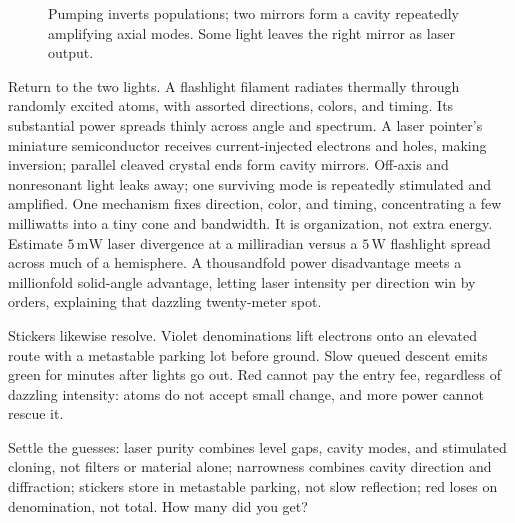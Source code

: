 \begin{figure}[htbp]
\centering
{}
\caption{Pumping inverts populations; two mirrors form a cavity repeatedly amplifying axial modes. Some light leaves the right mirror as laser output.}
\end{figure}


\begin{mainline}
Return to the two lights. A flashlight filament radiates thermally through randomly excited atoms, with assorted directions, colors, and timing. Its substantial power spreads thinly across angle and spectrum. A laser pointer's miniature semiconductor receives current-injected electrons and holes, making inversion; parallel cleaved crystal ends form cavity mirrors. Off-axis and nonresonant light leaks away; one surviving mode is repeatedly stimulated and amplified. One mechanism fixes direction, color, and timing, concentrating a few milliwatts into a tiny cone and bandwidth. It is organization, not extra energy. Estimate \(5\,\mathrm{mW}\) laser divergence at a milliradian versus a \(5\,\mathrm{W}\) flashlight spread across much of a hemisphere. A thousandfold power disadvantage meets a millionfold solid-angle advantage, letting laser intensity per direction win by orders, explaining that dazzling twenty-meter spot.

Stickers likewise resolve. Violet denominations lift electrons onto an elevated route with a metastable parking lot before ground. Slow queued descent emits green for minutes after lights go out. Red cannot pay the entry fee, regardless of dazzling intensity: atoms do not accept small change, and more power cannot rescue it.

Settle the guesses: laser purity combines level gaps, cavity modes, and stimulated cloning, not filters or material alone; narrowness combines cavity direction and diffraction; stickers store in metastable parking, not slow reflection; red loses on denomination, not total. How many did you get?
\end{mainline}

